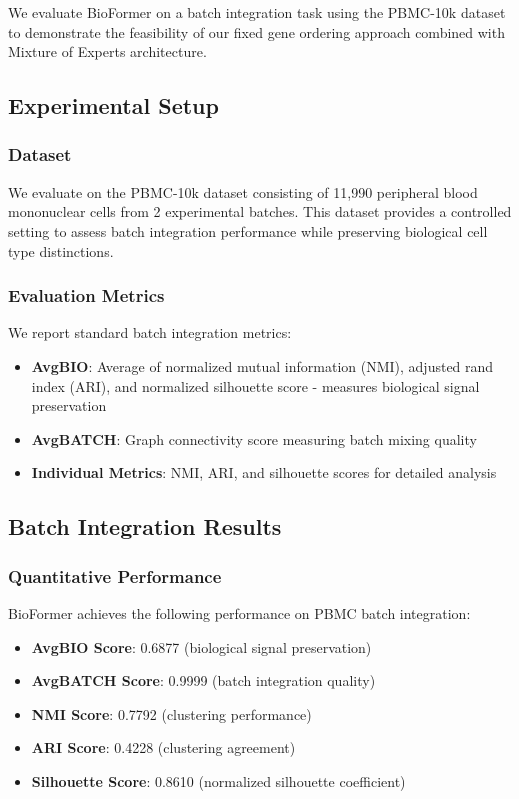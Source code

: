 We evaluate BioFormer on a batch integration task using the PBMC-10k dataset to demonstrate the feasibility of our fixed gene ordering approach combined with Mixture of Experts architecture.

\subsection{Experimental Setup}

\subsubsection{Dataset}
We evaluate on the PBMC-10k dataset consisting of 11,990 peripheral blood mononuclear cells from 2 experimental batches. This dataset provides a controlled setting to assess batch integration performance while preserving biological cell type distinctions.

\subsubsection{Evaluation Metrics}
We report standard batch integration metrics:
\begin{itemize}
\item \textbf{AvgBIO}: Average of normalized mutual information (NMI), adjusted rand index (ARI), and normalized silhouette score - measures biological signal preservation
\item \textbf{AvgBATCH}: Graph connectivity score measuring batch mixing quality
\item \textbf{Individual Metrics}: NMI, ARI, and silhouette scores for detailed analysis
\end{itemize}

\subsection{Batch Integration Results}

\subsubsection{Quantitative Performance}
BioFormer achieves the following performance on PBMC batch integration:

\begin{itemize}
\item \textbf{AvgBIO Score}: 0.6877 (biological signal preservation)
\item \textbf{AvgBATCH Score}: 0.9999 (batch integration quality)
\item \textbf{NMI Score}: 0.7792 (clustering performance)
\item \textbf{ARI Score}: 0.4228 (clustering agreement)
\item \textbf{Silhouette Score}: 0.8610 (normalized silhouette coefficient)
\end{itemize}

